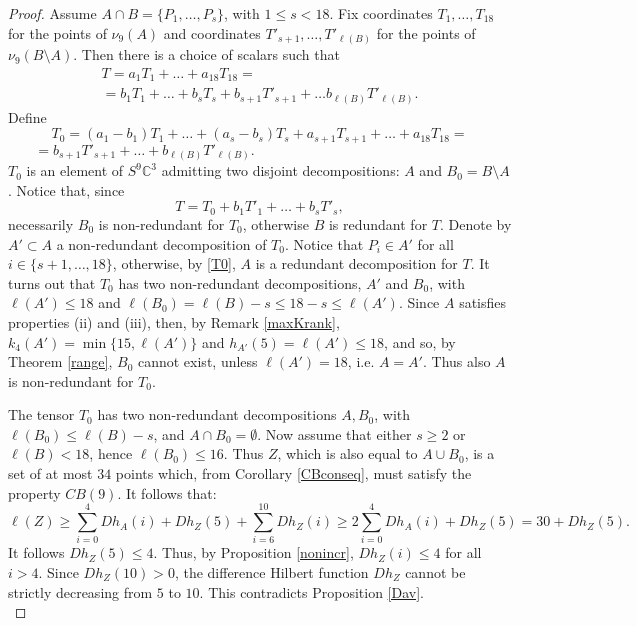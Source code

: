 \documentclass{amsart}
\newcommand{\C}{\mathbb{C}}
\theoremstyle{definition}
\begin{document}
\begin{proof}
Assume $ A \cap B = \{P_{1}, \ldots, P_{s}\} $, with $ 1\leq s <18 $. Fix coordinates $T_1,\dots,T_{18}$ for the points of $\nu_9(A)$ and coordinates
$T'_{s+1},\dots,T'_{\ell(B)}$ for the points of $\nu_9(B\setminus A)$. Then there is a choice of scalars such that
\begin{multline*} T = a_{1}T_1+ \ldots + a_{18}T_{18}= \\ =  b_{1}T_1+ \ldots + b_sT_s+ b_{s+1}T'_{s+1}+
\dots b_{\ell(B)}T'_{\ell(B)}. \end{multline*}
Define
$$ T_{0} = (a_{1}-b_{1}) T_1 + \ldots + (a_{s}-b_{s})T_s+ a_{s+1}T_{s+1}+ \ldots + a_{18}T_{18}=  $$
$$ = b_{s+1}T'_{s+1}+ \ldots + b_{\ell(B)}T'_{\ell(B)}. 
\quad\quad\quad\quad\quad\quad\quad\quad\quad\quad\quad\quad\quad\quad\quad\quad\,\,\, $$ 
$ T_{0} $ is an element of $ S^{9} \C^{3} $ admitting two disjoint decompositions: $ A $ and $ B_{0} = B \setminus A $. Notice that, since 
\begin{equation}\label{T0}
 T = T_{0} + b_{1}T'_1+ \ldots + b_{s}T'_s,  
\end{equation}   
necessarily $ B_{0} $ is non-redundant for $ T_{0} $, otherwise $B$ is redundant for $T$. Denote by $ A' \subset A $ a non-redundant decomposition of $ T_{0} $. 
Notice that $ P_{i} \in A' $ for all $ i \in \{s+1,\ldots, 18\} $, otherwise, by \eqref{T0}, $ A $ is a redundant decomposition for $ T $. It turns out that $ T_{0} $ 
has two non-redundant decompositions, $ A' $ and $ B_{0} $, with $ \ell(A') \leq 18 $ and $ \ell(B_{0}) = \ell(B) - s \leq 18 - s \leq \ell(A') $. Since $ A $ 
satisfies properties (ii) and (iii), then, by Remark \ref{maxKrank}, $ k_{4}(A') = \min \{15, \ell(A')\} $ and $ h_{A'}(5) = \ell(A') \leq 18 $, and so, 
by Theorem \ref{range}, $ B_{0} $ cannot exist, unless $\ell(A')=18$, i.e. $A=A'$. Thus also $ A $ is non-redundant for $ T_{0} $.

The tensor $ T_{0} $ has two non-redundant decompositions $A, B_0$, with $\ell(B_0)\leq \ell(B)-s$, and $ A \cap B_{0} = \emptyset $. 
Now assume that either $s\geq 2$ or $\ell(B)<18$, hence $\ell(B_0)\leq 16$. Thus $Z$,
which is also equal to $ A \cup B_{0} $, is a set of at most $34$ points which, from Corollary \ref{CBconseq},  must satisfy the property $\mathit{CB}(9)$.
It follows that:
$$ \ell(Z)\geq \sum_{i=0}^4 Dh_A(i)+Dh_Z(5)+\sum_{i=6}^{10} Dh_Z(i)\geq  2\sum_{i=0}^4 Dh_A(i)+Dh_Z(5) = 30+Dh_Z(5). $$
It follows $Dh_Z(5)\leq 4$. Thus, by Proposition \ref{nonincr}, $Dh_Z(i)\leq 4$ for all $i>4$. Since $Dh_Z(10)>0$, the difference Hilbert function
$Dh_Z$ cannot be strictly decreasing from $5$ to $10$. This contradicts Proposition \ref{Dav}.\\


\end{proof}
\end{document}
